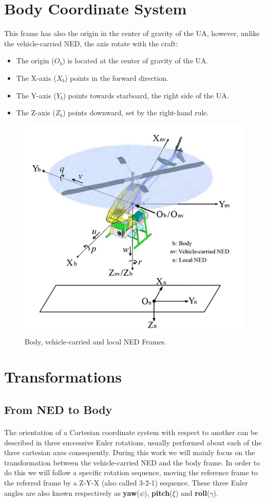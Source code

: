 \section{Body Coordinate System}\label{sec:body}
This frame has also the origin in the center of gravity of the UA, however, unlike the vehicle-carried NED, the axis rotate with the craft:
\begin{itemize}
\item{The origin (\textbf{$O_{b}$}) is located at the center of gravity of the UA.}
\item{The X-axis (\textbf{$X_{b}$}) points in the forward direction.}
\item{The Y-axis (\textbf{$Y_{b}$}) points towards starboard, the right side of the UA.}
\item{The Z-axis (\textbf{$Z_{b}$}) points downward, set by the right-hand rule.}
\end{itemize}
\begin{figure}[H]
   \centering
    \includegraphics[width=.70\textwidth]{figures/NEDtemp1.png} 
    \caption{Body, vehicle-carried and local NED Frames.\cite{Cai011}}  
    \label{fig:NED1}
\end{figure}

\section{Transformations}\label{sec:body}

\subsection*{From NED to Body}
\paragraph{} The orientation of a Cartesian coordinate system with respect to another can be described in three successive Euler rotations, usually performed about each of the three cartesian axes consequently. During this work we will mainly focus on the transformation between the vehicle-carried NED and the body frame. In order to do this we will follow a specific rotation sequence, moving the reference frame to the referred frame by a Z-Y-X (also called 3-2-1) sequence. These three Euler angles are also known respectively as \textbf{yaw}($\psi$), \textbf{pitch}($\xi$) and \textbf{roll}($\gamma$)\cite{EulerW}.

